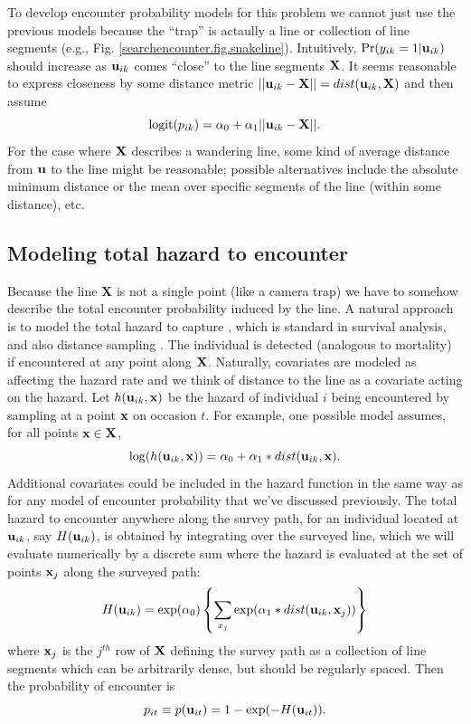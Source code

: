 To develop encounter probability models for this problem we cannot
just use the previous models because the ``trap'' is actaully a line
or collection of line segments (e.g.,
Fig. \ref{searchencounter.fig.snakeline}).  Intuitively,
$\Pr(y_{ik}=1|{\bf u}_{ik})$ should increase as ${\bf u}_{ik}$ comes
``close'' to the line segments ${\bf X}$. It seems reasonable to
express closeness by some distance metric $|| {\bf u}_{ik} - {\bf X}
|| = dist( {\bf u}_{ik}, {\bf X})$ and then assume
\[
\mbox{logit}(p_{ik}) = \alpha_{0} + \alpha_{1} || {\bf u}_{ik} - {\bf X} ||.
\]
For the case where ${\bf X}$ describes a wandering line, some
kind of average distance from ${\bf u}$ to the line
might be reasonable; possible alternatives include the absolute
minimum distance or the mean over specific segments
of the line (within some distance), etc.

\subsection{Modeling total hazard to encounter}

Because the line {\bf X} is not a single point (like a camera trap) we
have to somehow describe the total encounter probability induced by
the line. A natural approach is to model the total hazard to capture
\citep{borchers_efford:2008}, which is standard in survival analysis,
and also distance sampling \citep{hayes_buckland:1983,
  skaug_schweder:1999}.  The individual is detected (analogous to
mortality) if encountered at any point along ${\bf X}$. Naturally,
covariates are modeled as affecting the hazard rate and we think of
distance to the line as a covariate acting on the hazard. Let $h({\bf
  u}_{ik},{\bf x})$ be the hazard of individual $i$ being encountered
by sampling at a point ${\bf x}$ on occasion $t$.  For example, one
possible model assumes, for all points ${\bf x} \in {\bf X}$,
\begin{equation}
\log(h({\bf u}_{ik},{\bf x})) = \alpha_{0} + \alpha_{1}*dist({\bf u}_{ik},{\bf x}).
\label{eq.hazard}
\end{equation}
Additional covariates could be included in the hazard function in the
same way as for any model of encounter probability that we've
discussed previously.  The total hazard to encounter anywhere along
the survey path, for an individual located at ${\bf u}_{ik}$, say
$H({\bf u}_{ik})$, is obtained by integrating over the surveyed line,
which we will evaluate numerically by a discrete sum where the hazard
is evaluated at the set of points ${\bf x}_{j}$ along the surveyed
path:
\begin{equation}
H({\bf u}_{ik}) =  \exp(\alpha_{0}) \left\{ \sum_{x_{j}}  \exp(\alpha_{1}*dist({\bf
    u}_{ik},{\bf x}_{j})) \right\}
\label{eq.totalhazard}
\end{equation}
where ${\bf x}_{j}$ is the $j^{th}$ row of ${\bf X}$ defining the
survey path as a collection of line segments which can be arbitrarily
dense, but should be regularly spaced.  Then the probability of
encounter is
\begin{equation}
p_{it} \equiv p({\bf u}_{it}) = 1- \exp(-H({\bf u}_{it})).
\label{search-encounter.eq.encounterprob}
\end{equation}

